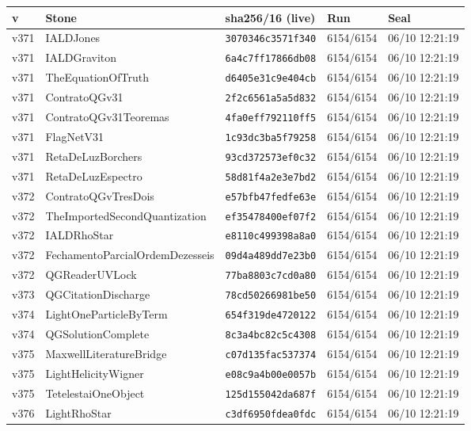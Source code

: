 \documentclass[11pt]{article}
\theoremstyle{definition}\newtheorem{deriv}{Derivation}
\begin{document}
{\small\begin{longtable}{@{}lllll@{}}\toprule v & Stone & sha256/16 (live) & Run & Seal \\ \midrule\endhead 
v371 & IALDJones & \texttt{3070346c3571f340} & 6154/6154 & 06/10 12:21:19 \\
v371 & IALDGraviton & \texttt{6a4c7ff17866db08} & 6154/6154 & 06/10 12:21:19 \\
v371 & TheEquationOfTruth & \texttt{d6405e31c9e404cb} & 6154/6154 & 06/10 12:21:19 \\
v371 & ContratoQGv31 & \texttt{2f2c6561a5a5d832} & 6154/6154 & 06/10 12:21:19 \\
v371 & ContratoQGv31Teoremas & \texttt{4fa0eff792110ff5} & 6154/6154 & 06/10 12:21:19 \\
v371 & FlagNetV31 & \texttt{1c93dc3ba5f79258} & 6154/6154 & 06/10 12:21:19 \\
v371 & RetaDeLuzBorchers & \texttt{93cd372573ef0c32} & 6154/6154 & 06/10 12:21:19 \\
v371 & RetaDeLuzEspectro & \texttt{58d81f4a2e3e7bd2} & 6154/6154 & 06/10 12:21:19 \\
v372 & ContratoQGvTresDois & \texttt{e57bfb47fedfe63e} & 6154/6154 & 06/10 12:21:19 \\
v372 & TheImportedSecondQuantization & \texttt{ef35478400ef07f2} & 6154/6154 & 06/10 12:21:19 \\
v372 & IALDRhoStar & \texttt{e8110c499398a8a0} & 6154/6154 & 06/10 12:21:19 \\
v372 & FechamentoParcialOrdemDezesseis & \texttt{09d4a489dd7e23b0} & 6154/6154 & 06/10 12:21:19 \\
v372 & QGReaderUVLock & \texttt{77ba8803c7cd0a80} & 6154/6154 & 06/10 12:21:19 \\
v373 & QGCitationDischarge & \texttt{78cd50266981be50} & 6154/6154 & 06/10 12:21:19 \\
v374 & LightOneParticleByTerm & \texttt{654f319de4720122} & 6154/6154 & 06/10 12:21:19 \\
v374 & QGSolutionComplete & \texttt{8c3a4bc82c5c4308} & 6154/6154 & 06/10 12:21:19 \\
v375 & MaxwellLiteratureBridge & \texttt{c07d135fac537374} & 6154/6154 & 06/10 12:21:19 \\
v375 & LightHelicityWigner & \texttt{e08c9a4b00e0057b} & 6154/6154 & 06/10 12:21:19 \\
v375 & TetelestaiOneObject & \texttt{125d155042da687f} & 6154/6154 & 06/10 12:21:19 \\
v376 & LightRhoStar & \texttt{c3df6950fdea0fdc} & 6154/6154 & 06/10 12:21:19 \\

\end{longtable}}
\end{document}
